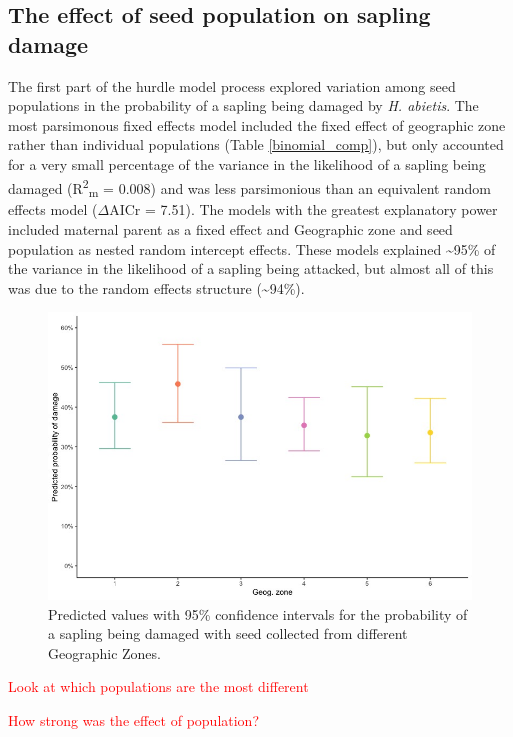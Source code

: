 \documentclass[a4paper, 11pt]{article}
\newcommand{\todo}[1]{\textcolor{red}{#1}}   %
\begin{document}
\subsection*{The effect of seed population on sapling damage}

The first part of the hurdle model process explored variation among seed populations in the probability of a sapling being damaged by \textit{H. abietis}. The most parsimonous fixed effects model included the fixed effect of geographic zone rather than individual populations (Table \ref{binomial_comp}), but only accounted for a very small percentage of the variance in the likelihood of a sapling being damaged (R\textsuperscript{2}\textsubscript{m} = 0.008) and was less parsimonious than an equivalent random effects model ($\Delta$AICr = 7.51). The models with the greatest explanatory power included maternal parent as a fixed effect and Geographic zone and seed population as nested random intercept effects. These models explained \textasciitilde{}95\% of the variance in the likelihood of a sapling being attacked, but almost all of this was due to the random effects structure (\textasciitilde{}94\%).

\begin{figure}
	\includegraphics[width=\textwidth]{pred_binom}
	\caption{Predicted values with 95\% confidence intervals for the probability of a sapling being damaged with seed collected from different Geographic Zones.}
\end{figure}

\todo{Look at which populations are the most different}

\todo{How strong was the effect of population?}
\end{document}
